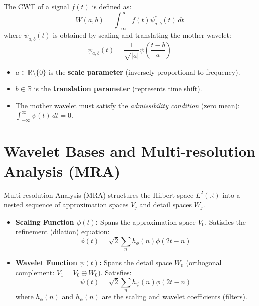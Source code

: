 \documentclass[12pt,a4paper]{article}
\begin{document}
\begin{tcolorbox}[formulabox, title={CWT Formulations}]
The CWT of a signal $f(t)$ is defined as:
\begin{equation}
  W(a,b) = \int_{-\infty}^{\infty} f(t) \psi_{a,b}^*(t) \, dt
\end{equation}
where $\psi_{a,b}(t)$ is obtained by scaling and translating the mother wavelet:
\begin{equation}
  \psi_{a,b}(t) = \frac{1}{\sqrt{|a|}} \psi\left(\frac{t - b}{a}\right)
\end{equation}
\begin{itemize}[leftmargin=*, itemsep=2.5pt]
  \item $a \in \mathbb{R} \setminus \{0\}$ is the \textbf{scale parameter} (inversely proportional to frequency).
  \item $b \in \mathbb{R}$ is the \textbf{translation parameter} (represents time shift).
  \item The mother wavelet must satisfy the \textit{admissibility condition} (zero mean): $\int_{-\infty}^{\infty} \psi(t) \, dt = 0$.
\end{itemize}
\end{tcolorbox}

\section{Wavelet Bases and Multi-resolution Analysis (MRA)}

Multi-resolution Analysis (MRA) structures the Hilbert space $L^2(\mathbb{R})$ into a nested sequence of approximation spaces $V_j$ and detail spaces $W_j$.

\begin{itemize}[leftmargin=*, itemsep=3.5pt]
  \item \textbf{Scaling Function $\phi(t)$:} Spans the approximation space $V_0$. Satisfies the refinement (dilation) equation:
    \begin{equation}
      \phi(t) = \sqrt{2} \sum_n h_\phi(n) \phi(2t - n)
    \end{equation}
  \item \textbf{Wavelet Function $\psi(t)$:} Spans the detail space $W_0$ (orthogonal complement: $V_1 = V_0 \oplus W_0$). Satisfies:
    \begin{equation}
      \psi(t) = \sqrt{2} \sum_n h_\psi(n) \phi(2t - n)
    \end{equation}
    where $h_\phi(n)$ and $h_\psi(n)$ are the scaling and wavelet coefficients (filters).
\end{itemize}
\end{document}
